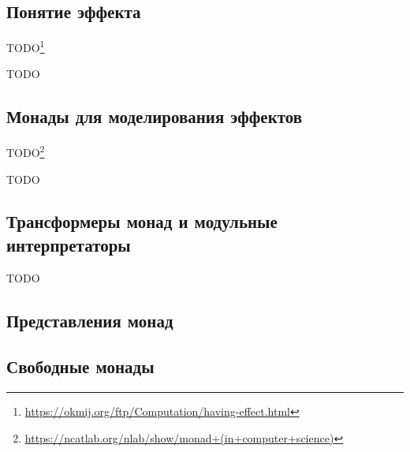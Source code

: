 


\subsection{Понятие эффекта}

TODO\footnote{\url{https://okmij.org/ftp/Computation/having-effect.html}} %

TODO %

\subsection{Монады для моделирования эффектов}



TODO\footnote{\url{https://ncatlab.org/nlab/show/monad+(in+computer+science)}} %

TODO %

\subsection{Трансформеры монад и модульные интерпретаторы}


TODO %

\subsection{Представления монад}











\subsection{Свободные монады}




